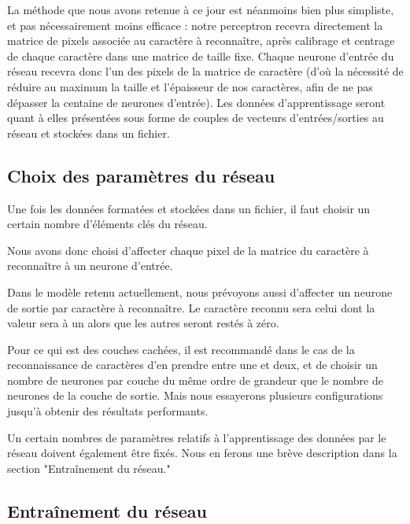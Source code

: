 \documentclass[a4paper,10pt]{report}
\begin{document}
La m\'ethode que nous avons retenue \`a ce jour est n\'eanmoins bien
plus simpliste, et pas n\'ecessairement moins efficace : notre
perceptron recevra directement la matrice de pixels associ\'ee au
caract\`ere \`a reconna\^itre, apr\`es calibrage et centrage de chaque
caract\`ere dans une matrice de taille fixe.
Chaque neurone d'entr\'ee du r\'eseau recevra donc l'un des pixels de la
matrice de caract\`ere (d'o\`u la n\'ecessit\'e de r\'eduire au maximum
la taille et l'\'epaisseur de nos caract\`eres, afin de ne pas
d\'epasser la centaine de neurones d'entr\'ee).
Les donn\'ees d'apprentissage seront quant \`a elles pr\'esent\'ees sous
forme de couples de vecteurs d'entr\'ees/sorties au r\'eseau et
stock\'ees dans un fichier.



\subsection{Choix des param\`etres du r\'eseau} %
\label{sec:choix_des_parametres_du_reseau}

Une fois les donn\'ees format\'ees et stock\'ees dans un fichier, il
faut choisir un certain nombre d'éléments clés du réseau.

Nous avons donc choisi d'affecter chaque pixel de la matrice du
caract\`ere \`a reconna\^itre \`a un neurone d'entr\'ee.

Dans le mod\`ele retenu actuellement, nous pr\'evoyons aussi d'affecter
un neurone de sortie par caract\`ere \`a reconna\^itre. Le caract\`ere
reconnu sera celui dont la valeur sera \`a un alors que les autres seront
rest\'es \`a z\'ero.

Pour ce qui est des couches cach\'ees, il est recommand\'e dans le cas
de la reconnaissance de caract\`eres d'en prendre entre une et deux, et
de choisir un nombre de neurones par couche du m\^eme ordre de grandeur
que le nombre de neurones de la couche de sortie. Mais nous essayerons
plusieurs configurations jusqu'\`a obtenir des r\'esultats
performants.

Un certain nombres de param\`etres relatifs \`a l'apprentissage des
donn\'ees par le r\'eseau doivent \'egalement \^etre fix\'es. Nous en
ferons une br\`eve description dans la section "Entra\^inement du r\'eseau."


\subsection{Entra\^inement du r\'eseau} %
\label{sec:entrainement_du_reseau}
\end{document}
